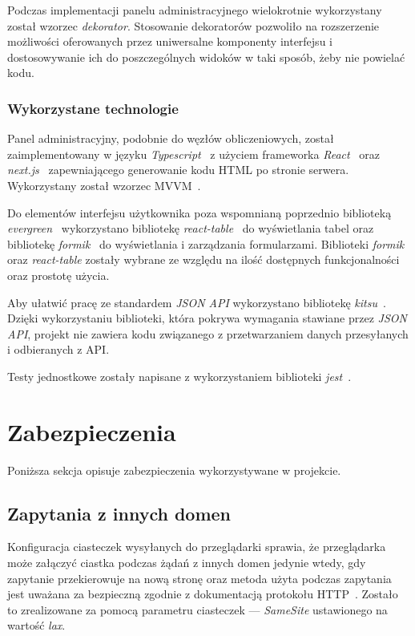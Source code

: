 \documentclass[a4paper,11pt,twoside]{report}
\theoremstyle{definition}
\begin{document}
Podczas implementacji panelu administracyjnego wielokrotnie wykorzystany został wzorzec \textit{dekorator}. Stosowanie dekoratorów pozwoliło na rozszerzenie możliwości oferowanych przez uniwersalne komponenty interfejsu i dostosowywanie ich do poszczególnych widoków w taki sposób, żeby nie powielać kodu.


\subsubsection{Wykorzystane technologie}
Panel administracyjny, podobnie do węzłów obliczeniowych, został zaimplementowany w języku \textit{Typescript}~\cite{typescript} z użyciem frameworka \textit{React}~\cite{react} oraz \textit{next.js}~\cite{next.js} zapewniającego generowanie kodu HTML po stronie serwera. Wykorzystany został wzorzec MVVM~\cite{mvvm}.

Do elementów interfejsu użytkownika poza wspomnianą poprzednio biblioteką \textit{evergreen}~\cite{evergreen} wykorzystano bibliotekę \textit{react-table}~\cite{react-table} do wyświetlania tabel oraz bibliotekę \textit{formik}~\cite{formik} do wyświetlania i zarządzania formularzami. Biblioteki \textit{formik} oraz \textit{react-table} zostały wybrane ze względu na ilość dostępnych funkcjonalności oraz prostotę użycia.

Aby ułatwić pracę ze standardem \textit{JSON API} wykorzystano bibliotekę \textit{kitsu}~\cite{kitsu}.
Dzięki wykorzystaniu biblioteki, która pokrywa wymagania stawiane przez \textit{JSON API}, projekt nie zawiera kodu związanego z przetwarzaniem danych przesyłanych i odbieranych z API.

Testy jednostkowe zostały napisane z wykorzystaniem biblioteki \textit{jest}~\cite{jest}.


\section{Zabezpieczenia}
\label{zabezpieczenia}

Poniższa sekcja opisuje zabezpieczenia wykorzystywane w projekcie.

\subsection{Zapytania z innych domen}

Konfiguracja ciasteczek wysyłanych do przeglądarki sprawia, że przeglądarka może załączyć ciastka podczas żądań z innych domen jedynie wtedy, gdy zapytanie przekierowuje na nową stronę oraz metoda użyta podczas zapytania jest uważana za bezpieczną zgodnie z dokumentacją protokołu HTTP~\cite{rfc-7231}.
Zostało to zrealizowane za pomocą parametru ciasteczek --- \textit{SameSite} ustawionego na wartość \textit{lax}.
\end{document}
